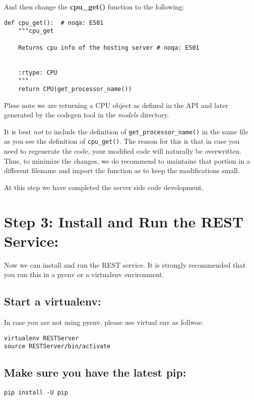 And then change the \textbf{cpu\_get()} function to the following:

\begin{lstlisting}
def cpu_get():  # noqa: E501
    """cpu_get

    Returns cpu info of the hosting server # noqa: E501


    :rtype: CPU
    """
    return CPU(get_processor_name())
\end{lstlisting}

Plese note we are returning a CPU object as defined in the API and later
generated by the codegen tool in the \emph{models} directory.

It is best \emph{not} to include the definition of
\texttt{get\_processor\_name()} in the same file as you see the
definition of \texttt{cpu\_get()}. The reason for this is that in case
you need to regenerate the code, your modified code will naturally be
overwritten. Thus, to minimize the changes, we do recommend to maintaine
that portion in a different filename and import the function as to keep
the modifications small.

At this step we have completed the server side code development.


\section{Step 3: Install and Run the REST
Service:}\label{step-3-install-and-run-the-rest-service}

Now we can install and run the REST service. It is strongly recommended
that you run this in a pyenv or a virtualenv environment.

\subsection{Start a virtualenv:}\label{start-a-virtualenv}

In case you are not using pyenv, please use virtual env as follwos:

\begin{lstlisting}
virtualenv RESTServer
source RESTServer/bin/activate
\end{lstlisting}

\subsection{Make sure you have the latest
pip:}\label{make-sure-you-have-the-latest-pip}

\begin{lstlisting}
pip install -U pip
\end{lstlisting}

